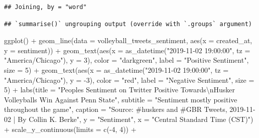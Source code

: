 \documentclass[
]{book}
\newenvironment{Shaded}{\begin{snugshade}}{\end{snugshade}}
\newcommand{\AttributeTok}[1]{\textcolor[rgb]{0.77,0.63,0.00}{#1}}
\newcommand{\DecValTok}[1]{\textcolor[rgb]{0.00,0.00,0.81}{#1}}
\newcommand{\FunctionTok}[1]{\textcolor[rgb]{0.00,0.00,0.00}{#1}}
\newcommand{\NormalTok}[1]{#1}
\newcommand{\SpecialCharTok}[1]{\textcolor[rgb]{0.00,0.00,0.00}{#1}}
\newcommand{\StringTok}[1]{\textcolor[rgb]{0.31,0.60,0.02}{#1}}
\begin{document}
\begin{verbatim}
## Joining, by = "word"
\end{verbatim}

\begin{verbatim}
## `summarise()` ungrouping output (override with `.groups` argument)
\end{verbatim}

\begin{Shaded}
\begin{Highlighting}[]
\FunctionTok{ggplot}\NormalTok{() }\SpecialCharTok{+}
  \FunctionTok{geom\_line}\NormalTok{(}\AttributeTok{data =}\NormalTok{ volleyball\_tweets\_sentiment, }\FunctionTok{aes}\NormalTok{(}\AttributeTok{x =}\NormalTok{ created\_at, }\AttributeTok{y =}\NormalTok{ sentiment)) }\SpecialCharTok{+}
  \FunctionTok{geom\_text}\NormalTok{(}\FunctionTok{aes}\NormalTok{(}\AttributeTok{x =} \FunctionTok{as\_datetime}\NormalTok{(}\StringTok{"2019{-}11{-}02 19:00:00"}\NormalTok{, }\AttributeTok{tz =} \StringTok{"America/Chicago"}\NormalTok{), }\AttributeTok{y =} \DecValTok{3}\NormalTok{), }\AttributeTok{color =} \StringTok{"darkgreen"}\NormalTok{, }\AttributeTok{label =} \StringTok{"Positive Sentiment"}\NormalTok{, }\AttributeTok{size =} \DecValTok{5}\NormalTok{) }\SpecialCharTok{+}
  \FunctionTok{geom\_text}\NormalTok{(}\FunctionTok{aes}\NormalTok{(}\AttributeTok{x =} \FunctionTok{as\_datetime}\NormalTok{(}\StringTok{"2019{-}11{-}02 19:00:00"}\NormalTok{, }\AttributeTok{tz =} \StringTok{"America/Chicago"}\NormalTok{), }\AttributeTok{y =} \SpecialCharTok{{-}}\DecValTok{3}\NormalTok{), }\AttributeTok{color =} \StringTok{"red"}\NormalTok{, }\AttributeTok{label =} \StringTok{"Negative Sentiment"}\NormalTok{, }\AttributeTok{size =} \DecValTok{5}\NormalTok{) }\SpecialCharTok{+}
  \FunctionTok{labs}\NormalTok{(}\AttributeTok{title =} \StringTok{"People\textquotesingle{}s Sentiment on Twitter Positive Towards}\SpecialCharTok{\textbackslash{}n}\StringTok{Husker Volleyball\textquotesingle{}s Win Against Penn State"}\NormalTok{,}
       \AttributeTok{subtitle =} \StringTok{"Sentiment mostly positive throughout the game"}\NormalTok{,}
       \AttributeTok{caption =} \StringTok{"Source: \#huskers and \#GBR Tweets, 2019{-}11{-}02 | By Collin K. Berke"}\NormalTok{,}
       \AttributeTok{y =} \StringTok{"Sentiment"}\NormalTok{,}
       \AttributeTok{x =} \StringTok{"Central Standard Time (CST)"}\NormalTok{) }\SpecialCharTok{+} 
  \FunctionTok{scale\_y\_continuous}\NormalTok{(}\AttributeTok{limits =} \FunctionTok{c}\NormalTok{(}\SpecialCharTok{{-}}\DecValTok{4}\NormalTok{, }\DecValTok{4}\NormalTok{)) }\SpecialCharTok{+}

\end{Highlighting}
\end{Shaded}
\end{document}
